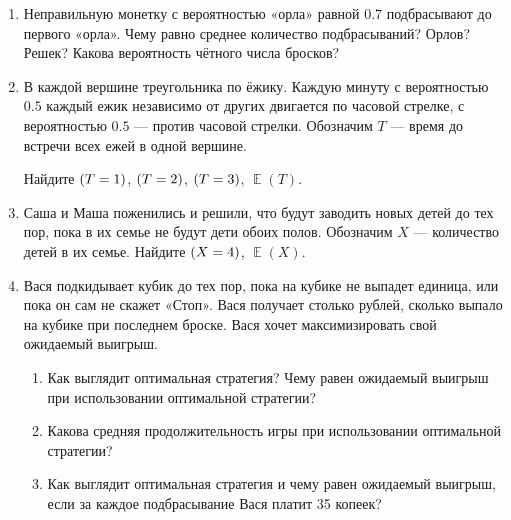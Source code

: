 \documentclass[12pt]{article}
\DeclareMathOperator{\E}{\mathbb{E}}
\let\P\relax
\DeclareMathOperator{\P}{\mathbb{P}}
\theoremstyle{definition}
\begin{document}
\begin{enumerate}
\item  Неправильную монетку с вероятностью «орла» равной $0.7$ подбрасывают до первого «орла».
Чему равно среднее количество подбрасываний?  Орлов? Решек? Какова вероятность чётного числа бросков? 

\item В каждой вершине треугольника по ёжику. Каждую минуту с вероятностью $0.5$ каждый ежик
независимо от других двигается по часовой стрелке, с вероятностью
$0.5$ — против часовой стрелки.
Обозначим $T$ — время до встречи всех ежей в одной вершине.

Найдите $\P(T=1)$, $\P(T=2)$, $\P(T=3)$, $\E(T)$.

\item Саша и Маша поженились и решили, что будут заводить новых детей до тех пор,
пока в их семье не будут дети обоих полов. Обозначим $X$ — количество детей в их семье.
Найдите $\P(X=4)$, $\E(X)$.

\item Вася подкидывает кубик до тех пор, пока на кубике не выпадет единица, или пока он сам не скажет «Стоп». 
Вася получает столько рублей, сколько выпало на кубике при последнем броске. 
Вася хочет максимизировать свой ожидаемый выигрыш.
\begin{enumerate}
\item Как выглядит оптимальная стратегия? Чему равен ожидаемый выигрыш при использовании оптимальной стратегии?
\item Какова средняя продолжительность игры при использовании оптимальной стратегии?
\item Как выглядит оптимальная стратегия и чему равен ожидаемый выигрыш, если за каждое
подбрасывание Вася платит 35 копеек?
\end{enumerate}

\end{enumerate}

\newpage
\end{document}
